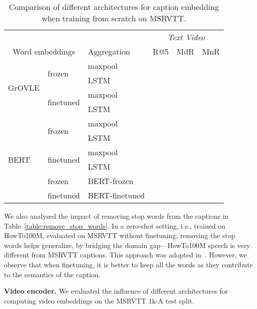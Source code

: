 \documentclass[runningheads]{llncs}
\begin{document}
\begin{table}[t]
\begin{center}
\caption{Comparison of different architectures for caption embedding when training from scratch on MSRVTT.}
\label{table:language_model}
\scriptsize
\begin{tabular}{l | l | l| @{\hskip -0.35cm}c @{\hskip -0.35cm}c @{\hskip -0.35cm}c}
\hline
\multicolumn{2}{c}{} & \multicolumn{1}{c}{} & \multicolumn{3}{c}{\textit{Text  Video}} \\
\multicolumn{2}{c|}{Word embeddings} & Aggregation & R@5 & MdR & MnR \\
\hline
\multirow{4}{*}{GrOVLE} & \multirow{2}{*}{frozen} & maxpool &  &  &  \\
                                                & & LSTM &  &  &  \\
                        \cline{2-6}
                         & \multirow{2}{*}{finetuned} & maxpool &  &  &  \\
                         & & LSTM &  &  &  \\
\hline
\multirow{6}{*}{BERT} & \multirow{2}{*}{frozen} & maxpool &  &  &  \\
                         & & LSTM &  &  &  \\
                         \cline{2-6}
                         & \multirow{2}{*}{finetuned} & maxpool &  &  &  \\
                         & & LSTM &  &  &  \\
                         \cline{2-6}
                         & frozen & BERT-frozen &  &  &  \\
                         & finetuned & BERT-finetuned &  &  &  \\
\hline
\end{tabular}
\end{center}
\end{table}

We also analysed the impact of removing stop words from the captions in Table~\ref{table:remove_stop_words}.
In a zero-shot setting, i.e., trained on HowTo100M, evaluated on MSRVTT without finetuning, removing the stop words helps generalize, by bridging the domain gap---HowTo100M speech is very different from MSRVTT captions. This approach was adopted in~\cite{miech2019MIL-NCE}. However, we observe that when finetuning, it is better to keep all the words as they contribute to the semantics of the caption.

\noindent\textbf{Video encoder.}
We evaluated the influence of different architectures for computing video embeddings on the MSRVTT 1k-A test split.
\end{document}
